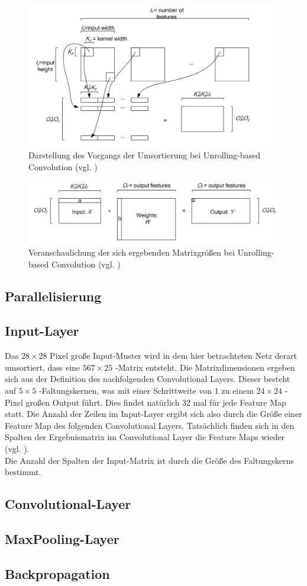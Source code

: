 \documentclass[../main.tex]{subfiles}
\begin{document}
\begin{figure}[!htbp]
	\centering
	\includegraphics[width=0.8\linewidth]{../images/Riedle/Unrolling_2.png}
	\caption{Darstellung des Vorgangs der Umsortierung bei Unrolling-based Convolution (vgl. \cite{UNROLLING_CONV})} \label{fig:cuda_unrolling_2}
\end{figure}
\begin{figure}[!htbp]
	\centering
	\includegraphics[width=0.8\linewidth]{../images/Riedle/Unrolling_3.png}
	\caption{Veranschaulichung der sich ergebenden Matrixgrößen bei Unrolling-based Convolution (vgl. \cite{UNROLLING_CONV})} \label{fig:cuda_unrolling_3}
\end{figure}

\subsection{Parallelisierung} \label{sec:cuda_parallelisierung}
\subsection{Input-Layer} \label{sec:cuda_input}

Das $28\times 28$ Pixel große Input-Muster wird in dem hier betrachteten Netz derart umsortiert, dass eine $567\times 25$ -Matrix entsteht. Die Matrixdimensionen ergeben sich aus der Definition des nachfolgenden Convolutional Layers. Dieser besteht auf $5\times 5$ -Faltungskernen, was mit einer Schrittweite von $1$ zu einem $24\times24$ -Pixel großen Output führt. Dies findet natürlich 32 mal für jede Feature Map statt. Die Anzahl der Zeilen im Input-Layer ergibt sich also durch die Größe einer Feature Map des folgenden Convolutional Layers. Tatsächlich finden sich in den Spalten der Ergebnismatrix im Convolutional Layer die Feature Maps wieder (vgl. \cite{UNROLLING_CONV}). \\ Die Anzahl der Spalten der Input-Matrix ist durch die Größe des Faltungskerns bestimmt.

\subsection{Convolutional-Layer} \label{sec:cuda_conv}
\subsection{MaxPooling-Layer} \label{sec:cuda_pooling}
\subsection{Backpropagation} \label{sec:cuda_back}
\end{document}
